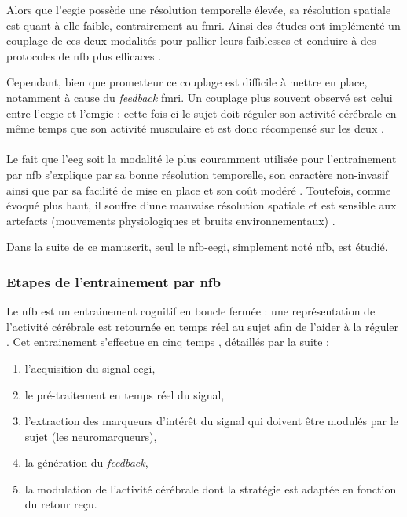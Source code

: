 Alors que l'\gls{eegie} possède une résolution temporelle élevée, sa résolution spatiale est quant à elle faible, 
contrairement au \gls{fmri}. Ainsi des études ont implémenté un couplage de ces deux modalités pour pallier leurs faiblesses et conduire à des 
protocoles de \gls{nfb} plus efficaces \citep{Perronnet2017}. 

Cependant, bien que prometteur ce couplage est difficile à mettre en place, notamment à cause du \textit{feedback} \gls{fmri}.
Un couplage plus souvent observé est celui entre l'\gls{eegie} et l'\gls{emgie} : cette fois-ci le sujet doit réguler son activité cérébrale en même temps que son
activité musculaire et est donc récompensé sur les deux \citep{Bink2014}. \\
\\
\indent Le fait que l'\gls{eeg} soit la modalité le plus couramment utilisée pour l'entrainement par \gls{nfb} s'explique par sa bonne résolution temporelle, son caractère non-invasif
ainsi que par sa facilité de mise en place et son coût modéré \citep{Fovet2016}. Toutefois, comme évoqué plus haut, il souffre d'une mauvaise résolution 
spatiale et est sensible aux artefacts (mouvements physiologiques et bruits environnementaux) \citep{Iwasaki2005, Goncharova2003}. 

Dans la suite de ce manuscrit, seul le \gls{nfb}-\gls{eegi}, simplement noté \gls{nfb}, est étudié. 

\subsubsection{Etapes de l'entrainement par \gls{nfb}} \label{steps_NFB_taining}

Le \gls{nfb} est un entrainement cognitif en boucle fermée : une représentation de l'activité cérébrale est retournée en temps réel
au sujet afin de l'aider à la réguler \citep{Enriquez2017}. Cet entrainement s'effectue en cinq temps \citep{Enriquez2017}, détaillés
par la suite :
\begin{enumerate}
\item l'acquisition du signal \gls{eegi}, 
\item le pré-traitement en temps réel du signal,
\item l'extraction des marqueurs d'intérêt du signal qui doivent être modulés par le sujet (les neuromarqueurs),
\item la génération du \textit{feedback},
\item la modulation de l'activité cérébrale dont la stratégie est adaptée en fonction du retour reçu. 
\end{enumerate}

